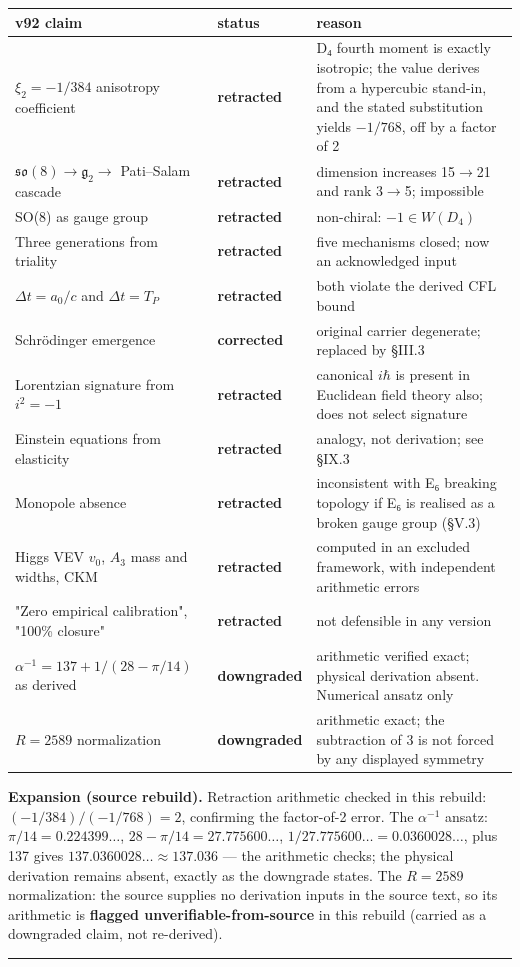 \documentclass[a4paper,11pt]{article}
\newcommand{\expansion}[1]{\par\smallskip\noindent\textbf{Expansion (source rebuild).} #1\par\smallskip}
\begin{document}
\begin{center}
\begin{xltabular}{\linewidth}{llX}
\hline
v92 claim & status & reason \\
\hline
$\xi_2=-1/384$ anisotropy coefficient & \textbf{retracted} & D₄ fourth moment is exactly isotropic; the value derives from a hypercubic stand-in, and the stated substitution yields $-1/768$, off by a factor of 2 \\
$\mathfrak{so}(8)\to\mathfrak{g}_2\to$ Pati–Salam cascade & \textbf{retracted} & dimension increases 15$\to$21 and rank 3$\to$5; impossible \\
SO(8) as gauge group & \textbf{retracted} & non-chiral: $-1\in W(D_4)$ \\
Three generations from triality & \textbf{retracted} & five mechanisms closed; now an acknowledged input \\
$\Delta t=a_0/c$ and $\Delta t=T_P$ & \textbf{retracted} & both violate the derived CFL bound \\
Schrödinger emergence & \textbf{corrected} & original carrier degenerate; replaced by §III.3 \\
Lorentzian signature from $i^2=-1$ & \textbf{retracted} & canonical $i\hbar$ is present in Euclidean field theory also; does not select signature \\
Einstein equations from elasticity & \textbf{retracted} & analogy, not derivation; see §IX.3 \\
Monopole absence & \textbf{retracted} & inconsistent with E₆ breaking topology if E₆ is realised as a broken gauge group (§V.3) \\
Higgs VEV $v_0$, $A_3$ mass and widths, CKM & \textbf{retracted} & computed in an excluded framework, with independent arithmetic errors \\
"Zero empirical calibration", "100\% closure" & \textbf{retracted} & not defensible in any version \\
$\alpha^{-1}=137+1/(28-\pi/14)$ as derived & \textbf{downgraded} & arithmetic verified exact; physical derivation absent. Numerical ansatz only \\
$R=2589$ normalization & \textbf{downgraded} & arithmetic exact; the subtraction of 3 is not forced by any displayed symmetry \\
\hline
\end{xltabular}
\end{center}


\expansion{Retraction arithmetic checked in this rebuild: $(-1/384)/(-1/768) = 2$, confirming the factor-of-2 error. The $\alpha^{-1}$ ansatz: $\pi/14 = 0.224399\ldots$, $28 - \pi/14 = 27.775600\ldots$, $1/27.775600\ldots = 0.0360028\ldots$, plus 137 gives $137.0360028\ldots \approx 137.036$ --- the arithmetic checks; the physical derivation remains absent, exactly as the downgrade states. The $R = 2589$ normalization: the source supplies no derivation inputs in the source text, so its arithmetic is \textbf{flagged unverifiable-from-source} in this rebuild (carried as a downgraded claim, not re-derived).}
\medskip\hrule\medskip
\end{document}
